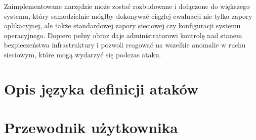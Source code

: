 \documentclass[11pt,a4paper,polish,thesis,oneside]{dcsbook}
\begin{document}
Zaimplementowane narzędzie może zostać rozbudowane i dołączone do większego systemu, który samodzielnie mógłby dokonywać ciągłej ewaluacji nie tylko zapory aplikacyjnej, ale także standardowej zapory sieciowej czy konfiguracji systemu operacyjnego. Dopiero pełny obraz daje administratorowi kontrolę nad stanem bezpieczeństwa infrastruktury i pozwoli reagować na wszelkie anomalie w ruchu sieciowym, które mogą wydarzyć się podczas ataku.

\appendix
\chapter{Opis języka definicji ataków}
\label{opisjezyka}
\chapter{Przewodnik użytkownika}

\backmatter
\end{document}
